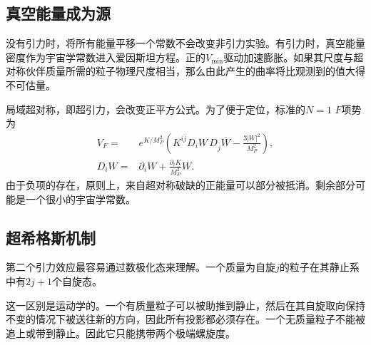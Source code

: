 \subsection{真空能量成为源}

没有引力时，将所有能量平移一个常数不会改变非引力实验。有引力时，真空能量密度作为宇宙学常数进入爱因斯坦方程。正的\(V_{\min}\)驱动加速膨胀。如果其尺度与超对称伙伴质量所需的粒子物理尺度相当，那么由此产生的曲率将比观测到的值大得不可估量。

\begin{classroomqa}
\end{classroomqa}

局域超对称，即超引力，会改变正平方公式。为了便于定位，标准的\(N=1\) \(F\)项势为
\begin{equation}
\begin{aligned}
V_F={}&e^{K/M_P^2}
\left(
K^{i\bar j}D_iW\,D_{\bar j}\overline W
-\frac{3|W|^2}{M_P^2}
\right),\\
D_iW={}&\partial_iW+\frac{\partial_iK}{M_P^2}W.
\end{aligned}
\label{eq:l9-sugra-potential}
\end{equation}
由于负项的存在，原则上，来自超对称破缺的正能量可以部分被抵消。剩余部分可能是一个很小的宇宙学常数。


\subsection{超希格斯机制}

第二个引力效应最容易通过数极化态来理解。一个质量为自旋\(j\)的粒子在其静止系中有\(2j+1\)个自旋态。

\begin{classroomqa}
\end{classroomqa}

这一区别是运动学的。一个有质量粒子可以被助推到静止，然后在其自旋取向保持不变的情况下被送往新的方向，因此所有投影都必须存在。一个无质量粒子不能被追上或带到静止。因此它只能携带两个极端螺旋度。

